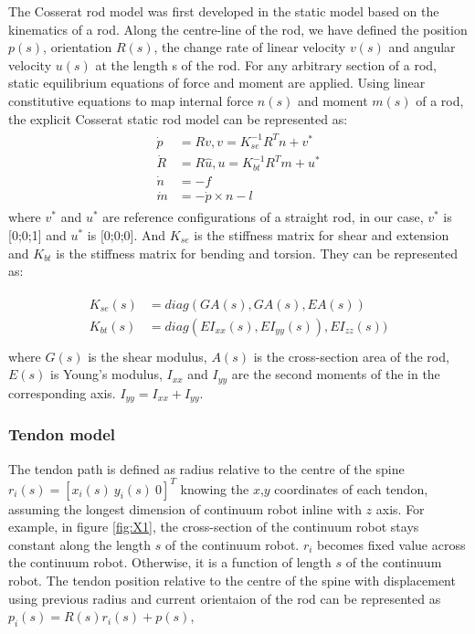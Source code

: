 The Cosserat rod model was first developed in the static model based on the kinematics of a rod. Along the centre-line of the rod, we have defined the position $p(s)$, orientation $R(s)$, the change rate of linear velocity $v(s)$ and angular velocity $u(s)$ at the length s of the rod. For any arbitrary section of a rod,  static equilibrium equations of force and moment are applied. Using linear constitutive equations to map internal force $n(s)$ and moment $m(s)$ of a rod, the explicit Cosserat static rod model can be represented as:
 \begin{align}
     \begin{split}
          \dot{p} & = Rv, v = K_{se}^{-1}R^Tn + v^{*}\\
          \dot{R} & = R\widehat{u}, u = K_{bt}^{-1}R^Tm + u^{*}\\
          \dot{n} & = -f\\
          \dot{m} & = -\dot{p}\times{n}-l
      \end{split}
      \label{eq:X1}
 \end{align}
where $v^*$ and $u^*$ are reference configurations of a straight rod, in our case, $v^*$ is [0;0;1] and $u^*$ is [0;0;0]. And $K_{se}$ is the stiffness matrix for shear and extension and $K_{bt}$ is the stiffness matrix for bending and torsion. They can be represented as:

\begin{align}
    \begin{split}
        K_{se}(s) & =diag(GA(s), GA(s), EA(s))\\
        K_{bt}(s) & =diag(EI_{xx}(s), EI_{yy}(s)), EI_{zz}(s))\\
    \end{split}
    \label{eq:X2}
\end{align}
where $G(s)$ is the shear modulus, $A(s)$ is the cross-section area of the rod, $E(s)$ is Young's modulus, $I_{xx}$ and $I_{yy}$ are the second moments of the in the corresponding axis. $I_{yy}=I_{xx}+I_{yy}$. 

\subsubsection{Tendon model}
 The tendon path is defined as radius relative to the centre of the spine $r_{i}(s) =[x_{i}(s)\: y_{i}(s)\: 0]^{T}$ knowing the $x$,$y$ coordinates of each tendon, assuming the longest dimension of continuum robot inline with $z$ axis. For example, in figure \ref{fig:X1}, the cross-section of the continuum robot stays constant along the length $s$ of the continuum robot. $r_{i}$ becomes fixed value across the continuum robot. Otherwise, it is a function of length $s$ of the continuum robot. The tendon position relative to the centre of the spine with displacement using previous radius and current orientaion of the rod can be represented as $p_{i}(s)  =R(s)r_{i}(s)+p(s)$, 
 
